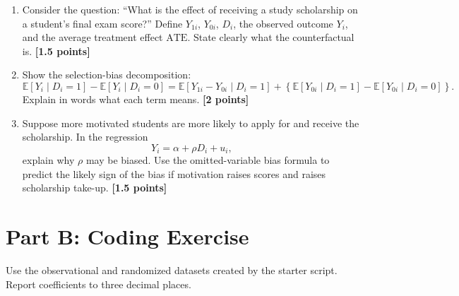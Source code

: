 \documentclass[11pt]{article}
\newcommand{\E}{\mathbb{E}}
\newcommand{\ATE}{\mathrm{ATE}}
\newcommand{\points}[1]{\hfill \textbf{[#1 points]}}
\begin{document}
\begin{enumerate}[label=A\arabic*.]
  \item Consider the question: ``What is the effect of receiving a study scholarship on a student's final exam score?'' Define \(Y_{1i}\), \(Y_{0i}\), \(D_i\), the observed outcome \(Y_i\), and the average treatment effect \(\ATE\). State clearly what the counterfactual is. \points{1.5}

  \item Show the selection-bias decomposition:
  \[
    \E[Y_i\mid D_i=1]-\E[Y_i\mid D_i=0]
    =
    \E[Y_{1i}-Y_{0i}\mid D_i=1]
    +
    \left\{\E[Y_{0i}\mid D_i=1]-\E[Y_{0i}\mid D_i=0]\right\}.
  \]
  Explain in words what each term means. \points{2}

  \item Suppose more motivated students are more likely to apply for and receive the scholarship. In the regression
  \[
    Y_i=\alpha+\rho D_i+u_i,
  \]
  explain why \(\rho\) may be biased. Use the omitted-variable bias formula to predict the likely sign of the bias if motivation raises scores and raises scholarship take-up. \points{1.5}
\end{enumerate}

\section*{Part B: Coding Exercise}

Use the observational and randomized datasets created by the starter script. Report coefficients to three decimal places.
\end{document}
